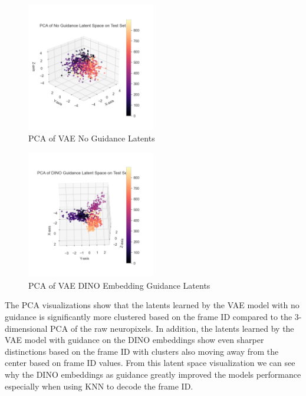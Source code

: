 \documentclass[12pt, letterpaper]{article}
\begin{document}
\begin{figure}[H]
    \centering
    \includegraphics[width=0.5\textwidth]{pca_no_guidance_latents.png}
    \caption{PCA of VAE No Guidance Latents}
    \label{fig:pca_no_guidance_latents}
\end{figure}

\begin{figure}[H]
    \centering
    \includegraphics[width=0.5\textwidth]{pca_DINO_guidance_latents.png}
    \caption{PCA of VAE DINO Embedding Guidance Latents}
    \label{fig:pca_DINO_guidance_latents}
\end{figure}

The PCA visualizations show that the latents learned by the VAE model with no guidance is significantly more clustered based on the frame ID compared to the $3$-dimensional PCA of the raw neuropixels. In addition, the latents learned by the VAE model with guidance on the DINO \cite{dino} embeddings show even sharper distinctions based on the frame ID with clusters also moving away from the center based on frame ID values. From this latent space visualization we can see why the DINO \cite{dino} embeddings as guidance greatly improved the models performance especially when using KNN to decode the frame ID.
\end{document}
